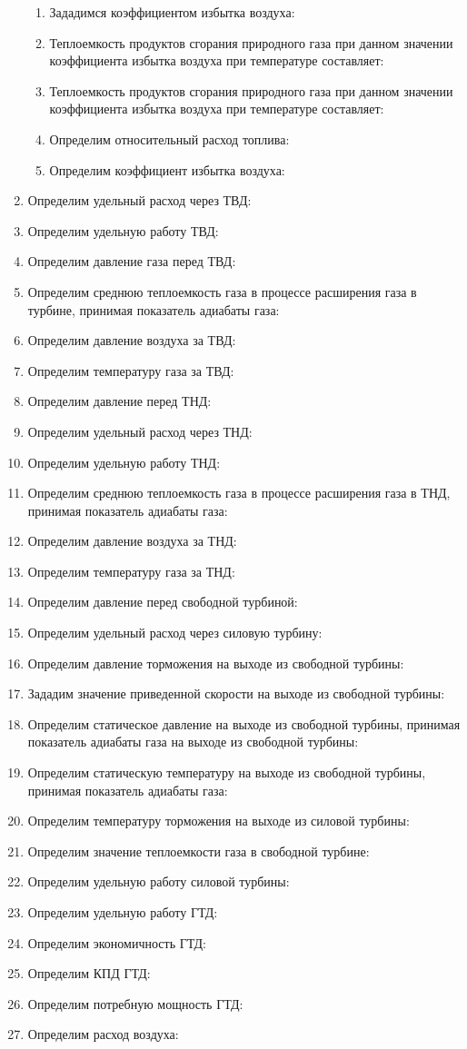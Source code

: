 \begin{enumerate}
	\begin{enumerate}
		\item Зададимся коэффициентом избытка воздуха:
		\item Теплоемкость продуктов сгорания природного газа при данном значении коэффициента избытка воздуха при температуре составляет:
		\item Теплоемкость продуктов сгорания природного газа при данном значении коэффициента избытка воздуха при температуре составляет:
		\item Определим относительный расход топлива:
		\item Определим коэффициент избытка воздуха:
	\end{enumerate}

	\item Определим удельный расход через ТВД:
	\item Определим удельную работу ТВД:
	\item Определим давление газа перед ТВД:
	\item Определим среднюю теплоемкость газа в процессе расширения газа в турбине, принимая показатель адиабаты газа:
	\item Определим давление воздуха за ТВД:
	\item Определим температуру газа за ТВД:
	\item Определим давление перед ТНД:
	\item Определим удельный расход через ТНД:
	\item Определим удельную работу ТНД:
	\item Определим среднюю теплоемкость газа в процессе расширения газа в ТНД, принимая показатель адиабаты газа:
	\item Определим давление воздуха за ТНД:
	\item Определим температуру газа за ТНД:
	\item Определим давление перед свободной турбиной:
	\item Определим удельный расход через силовую турбину:
    \item Определим давление торможения на выходе из свободной турбины:
	\item Зададим значение приведенной скорости на выходе из свободной турбины:
	\item Определим статическое давление на выходе из свободной турбины, принимая показатель адиабаты газа на выходе из свободной турбины:
	\item Определим статическую температуру на выходе из свободной турбины, принимая показатель адиабаты газа:
	\item Определим температуру торможения на выходе из силовой турбины:
	\item Определим значение теплоемкости газа в свободной турбине:
	\item Определим удельную работу силовой турбины:
	\item Определим удельную работу ГТД:
	\item Определим экономичность ГТД:
	\item Определим КПД ГТД:
	\item Определим потребную мощность ГТД:
	\item Определим расход воздуха:
\end{enumerate}